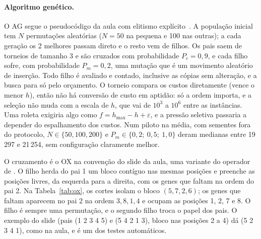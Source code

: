\paragraph{Algoritmo genético.}
O AG segue o pseudocódigo da aula com elitismo explícito~\citep{slides2026cap4}.
A população inicial tem $N$ permutações aleatórias ($N = 50$ na pequena e 100 nas outras); a cada geração os 2 melhores passam direto e o resto vem de filhos.
Os pais saem de torneios de tamanho 3 e são cruzados com probabilidade $P_c = 0{,}9$, e cada filho sofre, com probabilidade $P_m = 0{,}2$, uma mutação que é um movimento aleatório de inserção.
Todo filho é avaliado e contado, inclusive as cópias sem alteração, e a busca para só pelo orçamento.
O torneio compara os custos diretamente (vence o menor $h$), então não há conversão de custo em aptidão: só a ordem importa, e a seleção não muda com a escala de $h$, que vai de $10^3$ a $10^6$ entre as instâncias.
Uma roleta exigiria algo como $f = h_{\max} - h + \varepsilon$, e a pressão seletiva passaria a depender do espalhamento dos custos.
Num piloto na média, com sementes fora do protocolo, $N \in \{50, 100, 200\}$ e $P_m \in \{0{,}2;\ 0{,}5;\ 1{,}0\}$ deram medianas entre 19\,297 e 21\,254, sem configuração claramente melhor.

O cruzamento é o OX na convenção do slide da aula, uma variante do operador de \citet{davis1985epistatic}.
O filho herda do pai 1 um bloco contíguo nas mesmas posições e preenche as posições livres, da esquerda para a direita, com os genes que faltam na ordem do pai 2.
Na Tabela~\ref{tab:ox}, os cortes isolam o bloco $(5, 7, 2, 6)$; os genes que faltam aparecem no pai 2 na ordem $3, 8, 1, 4$ e ocupam as posições 1, 2, 7 e 8.
O filho é sempre uma permutação, e o segundo filho troca o papel dos pais.
O exemplo do slide (pais (1 2 3 4 5) e (5 4 2 1 3), bloco nas posições 2 a 4) dá (5 2 3 4 1), como na aula, e é um dos testes automáticos.

\begin{table}[tbp]
  \centering
  \caption{Exemplo do cruzamento OX ($n = 8$). Em negrito, os genes que vêm do pai 2.}
  \label{tab:ox}
\end{table}
